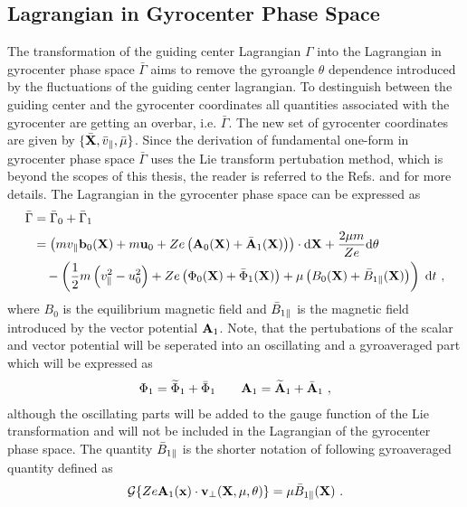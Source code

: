 \newpage

\subsection{Lagrangian in Gyrocenter Phase Space}
\label{sub:gyrocenterLagrangian}

The transformation of the guiding center Lagrangian $\Gamma$ into the Lagrangian in gyrocenter phase space $\bar{\Gamma}$ aims to remove the gyroangle $\theta$ dependence introduced by the fluctuations of the guiding center lagrangian. To destinguish between the guiding center and the gyrocenter coordinates all quantities associated with the gyrocenter are getting an overbar, i.e. $\bar{\Gamma}$.  The new set of gyrocenter coordinates are given by $\{\bar{\boldsymbol{\mathbf{X}}}, \bar{v}_\parallel, \bar{\mu}\}$. Since the derivation of fundamental one-form in gyrocenter phase space $\bar{\Gamma}$ uses the Lie transform pertubation method, which is beyond the scopes of this thesis, the reader is referred to the Refs.  and  for more details. The Lagrangian in the gyrocenter phase space can be expressed as
\begin{gather}
    \begin{aligned}
        \bar{\Gamma} &= \bar{\Gamma}_0 + \bar{\Gamma}_1 \\
                     &= \left(mv_\parallel \boldsymbol{\mathbf{b}}_0(\boldsymbol{\mathbf{X}}) + m\boldsymbol{\mathbf{u}}_0 + Ze\left(\boldsymbol{\mathbf{A}}_0(\boldsymbol{\mathbf{X}}) + \bar{\boldsymbol{\mathbf{A}}}_1(\boldsymbol{\mathbf{X}})\right)\right) \cdot \mathrm{d}\boldsymbol{\mathbf{X}} + \frac{2\mu m}{Ze} \mathrm{d}\theta \\
                     &\quad - \left(\frac{1}{2} m \left(v_\parallel^2 - u_0^2 \right) + Ze \left(\Phi_0(\boldsymbol{\mathbf{X}}) + \bar{\Phi}_1(\boldsymbol{\mathbf{X}})\right) + \mu\left(B_0(\boldsymbol{\mathbf{X}}) + \bar{B}_{1\parallel}(\boldsymbol{\mathbf{X}})\right)\right)\;\mathrm{d}t~,
    \end{aligned}
    \label{eq:gyrocenterPertrubationLagrangian}
\end{gather}
where $B_0$ is the equilibrium magnetic field and $\bar{B}_{1\parallel}$ is the magnetic field introduced by the vector potential $\boldsymbol{\mathbf{A}}_1$. Note, that the pertubations of the scalar and vector potential will be seperated into an oscillating and a gyroaveraged part which will be expressed as
\begin{gather}
    \Phi_1 = \widetilde{\Phi}_1 + \bar{\Phi}_1  \qquad \boldsymbol{\mathbf{A}}_1 = \widetilde{\boldsymbol{\mathbf{A}}}_1 + \bar{\boldsymbol{\mathbf{A}}}_1 ~,
    \label{eq:electromagneticPertubationSeperated}
\end{gather}
although the oscillating parts will be added to the gauge function of the Lie transformation and will not be included in the Lagrangian of the gyrocenter phase space. The quantity $\bar{B}_{1\parallel}$ is the shorter notation of following gyroaveraged quantity defined as
\begin{gather}
    \mathcal{G} \{Ze \boldsymbol{\mathbf{A}}_1(\boldsymbol{\mathbf{x}}) \cdot \boldsymbol{\mathbf{v}}_\perp (\boldsymbol{\mathbf{X}},\mu,\theta)\} = \mu\bar{B}_{1\parallel}(\boldsymbol{\mathbf{X}})~. 
    \label{eq:gyrocenterGyroaveragedMagnetic}
\end{gather}